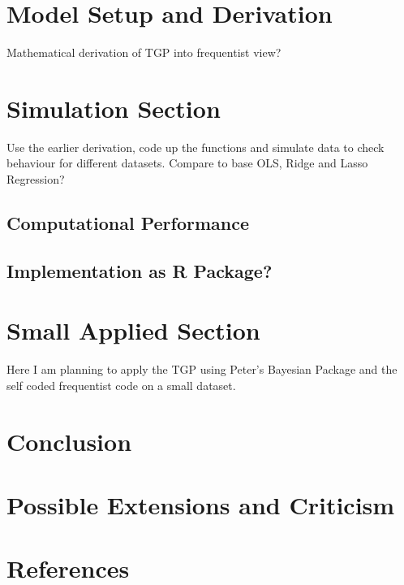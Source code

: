 \documentclass[12pt,a4paper]{article}
\begin{document}
\section{Model Setup and Derivation}
Mathematical derivation of TGP into frequentist view?

\section{Simulation Section}
Use the earlier derivation, code up the functions and simulate data to check behaviour for different datasets. Compare to base OLS, Ridge and Lasso Regression?
\subsection{Computational Performance}
\subsection{Implementation as R Package?}

\section{Small Applied Section}
Here I am planning to apply the TGP using Peter's Bayesian Package and the self coded frequentist code on a small dataset.
\section{Conclusion}
\section{Possible Extensions and Criticism}
\section{References}

\pagebreak
{}
\setcounter{page}{\thesavepage}
\pagestyle{plain}
%
%
\printbibliography[]
\clearpage
\appendix
\end{document}
